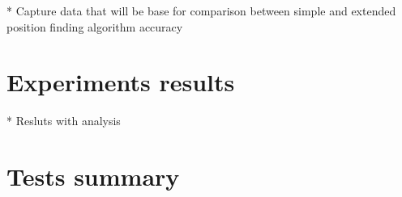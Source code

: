 \documentclass[../main.tex]{subfiles}
\begin{document}
* Capture data that will be base for comparison between simple and extended position finding algorithm accuracy


\section{Experiments results} %
\label{sec:experiments_results}

* Resluts with analysis


\section{Tests summary} %
\label{sec:tests_summary}

\end{document}
